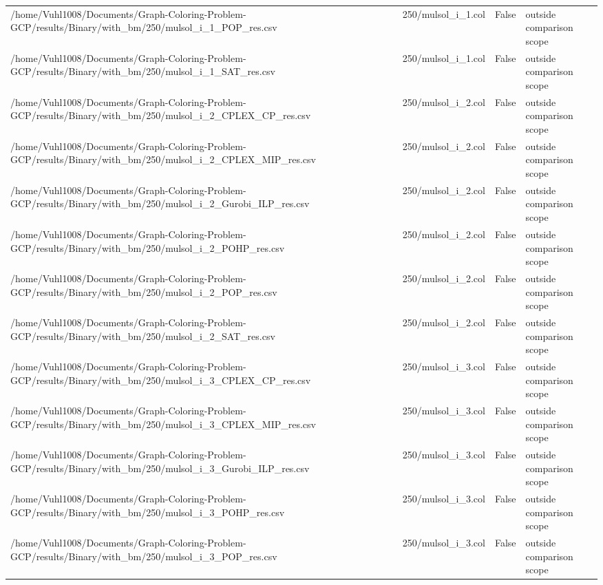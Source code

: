 \begin{table}[htbp]
\begin{tabular}{llll}
/home/Vuhl1008/Documents/Graph-Coloring-Problem-GCP/results/Binary/with\_bm/250/mulsol\_i\_1\_POP\_res.csv & 250/mulsol\_i\_1.col & False & outside comparison scope \\
/home/Vuhl1008/Documents/Graph-Coloring-Problem-GCP/results/Binary/with\_bm/250/mulsol\_i\_1\_SAT\_res.csv & 250/mulsol\_i\_1.col & False & outside comparison scope \\
/home/Vuhl1008/Documents/Graph-Coloring-Problem-GCP/results/Binary/with\_bm/250/mulsol\_i\_2\_CPLEX\_CP\_res.csv & 250/mulsol\_i\_2.col & False & outside comparison scope \\
/home/Vuhl1008/Documents/Graph-Coloring-Problem-GCP/results/Binary/with\_bm/250/mulsol\_i\_2\_CPLEX\_MIP\_res.csv & 250/mulsol\_i\_2.col & False & outside comparison scope \\
/home/Vuhl1008/Documents/Graph-Coloring-Problem-GCP/results/Binary/with\_bm/250/mulsol\_i\_2\_Gurobi\_ILP\_res.csv & 250/mulsol\_i\_2.col & False & outside comparison scope \\
/home/Vuhl1008/Documents/Graph-Coloring-Problem-GCP/results/Binary/with\_bm/250/mulsol\_i\_2\_POHP\_res.csv & 250/mulsol\_i\_2.col & False & outside comparison scope \\
/home/Vuhl1008/Documents/Graph-Coloring-Problem-GCP/results/Binary/with\_bm/250/mulsol\_i\_2\_POP\_res.csv & 250/mulsol\_i\_2.col & False & outside comparison scope \\
/home/Vuhl1008/Documents/Graph-Coloring-Problem-GCP/results/Binary/with\_bm/250/mulsol\_i\_2\_SAT\_res.csv & 250/mulsol\_i\_2.col & False & outside comparison scope \\
/home/Vuhl1008/Documents/Graph-Coloring-Problem-GCP/results/Binary/with\_bm/250/mulsol\_i\_3\_CPLEX\_CP\_res.csv & 250/mulsol\_i\_3.col & False & outside comparison scope \\
/home/Vuhl1008/Documents/Graph-Coloring-Problem-GCP/results/Binary/with\_bm/250/mulsol\_i\_3\_CPLEX\_MIP\_res.csv & 250/mulsol\_i\_3.col & False & outside comparison scope \\
/home/Vuhl1008/Documents/Graph-Coloring-Problem-GCP/results/Binary/with\_bm/250/mulsol\_i\_3\_Gurobi\_ILP\_res.csv & 250/mulsol\_i\_3.col & False & outside comparison scope \\
/home/Vuhl1008/Documents/Graph-Coloring-Problem-GCP/results/Binary/with\_bm/250/mulsol\_i\_3\_POHP\_res.csv & 250/mulsol\_i\_3.col & False & outside comparison scope \\
/home/Vuhl1008/Documents/Graph-Coloring-Problem-GCP/results/Binary/with\_bm/250/mulsol\_i\_3\_POP\_res.csv & 250/mulsol\_i\_3.col & False & outside comparison scope \\

\end{tabular}
\end{table}
